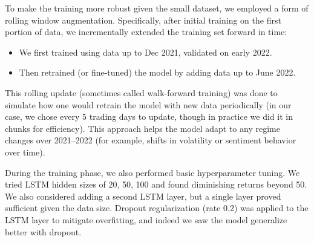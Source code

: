 \documentclass[conference]{IEEEtran}
\begin{document}
To make the training more robust given the small dataset, we employed a form of rolling window augmentation. Specifically, after initial training on the first portion of data, we incrementally extended the training set forward in time:
\begin{itemize}
	\item We first trained using data up to Dec 2021, validated on early 2022.
	\item Then retrained (or fine-tuned) the model by adding data up to June 2022.
\end{itemize}
This rolling update (sometimes called walk-forward training) was done to simulate how one would retrain the model with new data periodically (in our case, we chose every 5 trading days to update, though in practice we did it in chunks for efficiency). This approach helps the model adapt to any regime changes over 2021--2022 (for example, shifts in volatility or sentiment behavior over time).

During the training phase, we also performed basic hyperparameter tuning. We tried LSTM hidden sizes of 20, 50, 100 and found diminishing returns beyond 50. We also considered adding a second LSTM layer, but a single layer proved sufficient given the data size. Dropout regularization (rate 0.2) was applied to the LSTM layer to mitigate overfitting, and indeed we saw the model generalize better with dropout.
\end{document}
